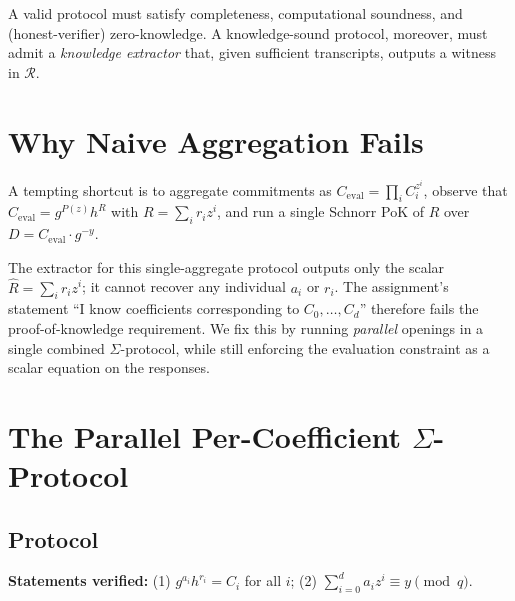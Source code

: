 \documentclass[11pt,a4paper]{article}
\begin{document}
A valid protocol must satisfy completeness, computational soundness, and
(honest-verifier) zero-knowledge. A knowledge-sound protocol, moreover,
must admit a \emph{knowledge extractor} that, given sufficient
transcripts, outputs a witness in $\mathcal{R}$.

\section{Why Naive Aggregation Fails}

A tempting shortcut is to aggregate commitments as
$C_{\mathrm{eval}} = \prod_i C_i^{z^i}$, observe that
$C_{\mathrm{eval}} = g^{P(z)} h^{R}$ with $R = \sum_i r_i z^{i}$, and
run a single Schnorr PoK of $R$ over $D = C_{\mathrm{eval}}\cdot g^{-y}$.

The extractor for this single-aggregate protocol outputs only the scalar
$\hat{R} = \sum_i r_i z^{i}$; it cannot recover any individual $a_i$ or
$r_i$. The assignment's statement ``I know coefficients corresponding to
$C_0,\dots,C_d$'' therefore fails the proof-of-knowledge requirement.
We fix this by running \emph{parallel} openings in a single combined
$\Sigma$-protocol, while still enforcing the evaluation constraint as a
scalar equation on the responses.

\section{The Parallel Per-Coefficient $\Sigma$-Protocol}

\subsection{Protocol}

\textbf{Statements verified:} (1) $g^{a_i} h^{r_i} = C_i$ for all $i$;
(2) $\sum_{i=0}^{d} a_i z^{i} \equiv y \pmod q$.
\end{document}
